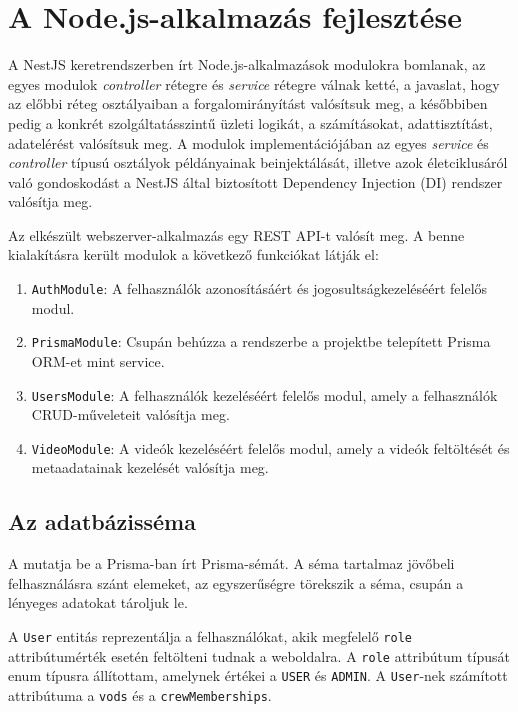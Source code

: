 \section{A Node.js-alkalmazás fejlesztése}\label{sec:nodejs}

A NestJS keretrendszerben írt Node.js-alkalmazások modulokra bomlanak, az egyes modulok \emph{controller} rétegre és \emph{service} rétegre válnak ketté, a javaslat, hogy az előbbi réteg osztályaiban a forgalomirányítást valósítsuk meg, a későbbiben pedig a konkrét szolgáltatásszintű üzleti logikát, a számításokat, adattisztítást, adatelérést valósítsuk meg. A modulok implementációjában az egyes \emph{service} és \emph{controller} típusú osztályok példányainak beinjektálását, illetve azok életciklusáról való gondoskodást a NestJS által biztosított Dependency Injection (DI) rendszer valósítja meg.

Az elkészült webszerver-alkalmazás egy REST API-t valósít meg. A benne kialakításra került modulok a következő funkciókat látják el:

\begin{enumerate}
  \item \verb|AuthModule|: A felhasználók azonosításáért és jogosultságkezeléséért felelős modul.
  \item \verb|PrismaModule|: Csupán behúzza a rendszerbe a projektbe telepített Prisma ORM-et mint service.
  \item \verb|UsersModule|: A felhasználók kezeléséért felelős modul, amely a felhasználók CRUD-műveleteit valósítja meg.
  \item \verb|VideoModule|: A videók kezeléséért felelős modul, amely a videók feltöltését és metaadatainak kezelését valósítja meg.
\end{enumerate}

\subsection{Az adatbázisséma}

A  mutatja be a Prisma-ban írt Prisma-sémát. A séma tartalmaz jövőbeli felhasználásra szánt elemeket, az egyszerűségre törekszik a séma, csupán a lényeges adatokat tároljuk le.

A \verb|User| entitás reprezentálja a felhasználókat, akik megfelelő \verb|role| attribútumérték esetén feltölteni tudnak a weboldalra. A \verb|role| attribútum típusát enum típusra állítottam, amelynek értékei a \verb|USER| és \verb|ADMIN|. A \verb|User|-nek számított attribútuma a \verb|vods| és a \verb|crewMemberships|.


